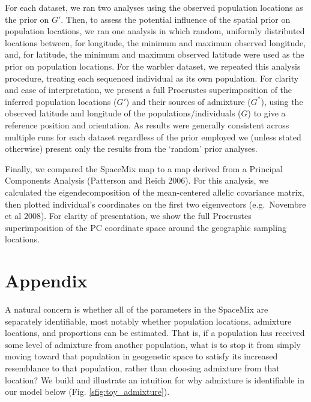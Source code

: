 \documentclass[12pt]{article}
\newcommand{\identifyadmixsource}[1]{{#1^{*}}}
\begin{document}
For each dataset, we ran two analyses using the observed population locations as the prior on $G'$.  Then, to assess the potential influence of the spatial prior on population locations, we ran one analysis in which random, uniformly distributed locations between, for longitude, the minimum and maximum observed longitude, and, for latitude, the minimum and maximum observed latitude were used as the prior on population locations.  For the warbler dataset, we repeated this analysis procedure, treating each sequenced individual as its own population.  For clarity and ease of interpretation, we present a full Procrustes superimposition of the inferred population locations ($G'$) and their sources of admixture ($\identifyadmixsource{G}$), using the observed latitude and longitude of the populations/individuals ($G$) to give a reference position and orientation.  As results were generally consistent across multiple runs for each dataset regardless of the prior employed we (unless stated otherwise) present only the results from the `random' prior analyses.

Finally, we compared the SpaceMix map to a map derived from a Principal Components Analysis (Patterson and Reich 2006).  For this analysis, we calculated the eigendecomposition of the mean-centered allelic covariance matrix, then plotted individual's coordinates on the first two eigenvectors (e.g.\ Novembre et al 2008).  For clarity of presentation, we show the full Procrustes superimposition of the PC coordinate space around the geographic sampling locations.

\newpage
\section*{Appendix}
A natural concern is whether all of the parameters in the SpaceMix are separately identifiable, most notably whether population locations, admixture locations, and proportions can be estimated. That is, if a population has received some level of admixture from another population, what is to stop it from simply moving toward that population in geogenetic space to satisfy its increased resemblance to that population, rather than choosing admixture from that location?  We build and illustrate an intuition for why admixture is identifiable in our model below (Fig. \ref{sfig:toy_admixture}).
\end{document}

